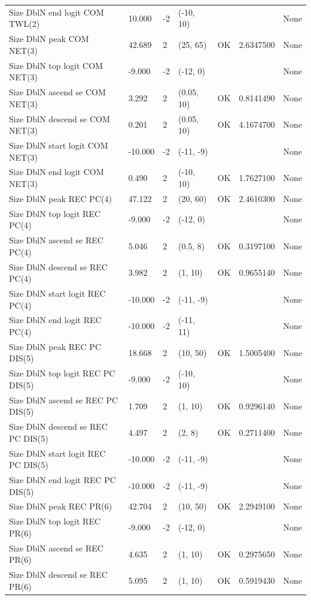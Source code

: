 \documentclass[11pt,
  english,
  a4paper,
]{article}
\begin{document}
\begin{landscape}
\begin{longtable}[t]{>{\raggedright\arraybackslash}p{8.5cm}lllll>{\raggedright\arraybackslash}p{4cm}}
Size DblN end logit COM TWL(2) & 10.000 & -2 & (-10, 10) &  &  & None\\
Size DblN peak COM NET(3) & 42.689 & 2 & (25, 65) & OK & 2.6347500 & None\\
Size DblN top logit COM NET(3) & -9.000 & -2 & (-12, 0) &  &  & None\\
Size DblN ascend se COM NET(3) & 3.292 & 2 & (0.05, 10) & OK & 0.8141490 & None\\
Size DblN descend se COM NET(3) & 0.201 & 2 & (0.05, 10) & OK & 4.1674700 & None\\
Size DblN start logit COM NET(3) & -10.000 & -2 & (-11, -9) &  &  & None\\
Size DblN end logit COM NET(3) & 0.490 & 2 & (-10, 10) & OK & 1.7627100 & None\\
Size DblN peak REC PC(4) & 47.122 & 2 & (20, 60) & OK & 2.4610300 & None\\
Size DblN top logit REC PC(4) & -9.000 & -2 & (-12, 0) &  &  & None\\
Size DblN ascend se REC PC(4) & 5.046 & 2 & (0.5, 8) & OK & 0.3197100 & None\\
Size DblN descend se REC PC(4) & 3.982 & 2 & (1, 10) & OK & 0.9655140 & None\\
Size DblN start logit REC PC(4) & -10.000 & -2 & (-11, -9) &  &  & None\\
Size DblN end logit REC PC(4) & -10.000 & -2 & (-11, 11) &  &  & None\\
Size DblN peak REC PC DIS(5) & 18.668 & 2 & (10, 50) & OK & 1.5005400 & None\\
Size DblN top logit REC PC DIS(5) & -9.000 & -2 & (-10, 10) &  &  & None\\
Size DblN ascend se REC PC DIS(5) & 1.709 & 2 & (1, 10) & OK & 0.9296140 & None\\
Size DblN descend se REC PC DIS(5) & 4.497 & 2 & (2, 8) & OK & 0.2711400 & None\\
Size DblN start logit REC PC DIS(5) & -10.000 & -2 & (-11, -9) &  &  & None\\
Size DblN end logit REC PC DIS(5) & -10.000 & -2 & (-11, -9) &  &  & None\\
Size DblN peak REC PR(6) & 42.704 & 2 & (10, 50) & OK & 2.2949100 & None\\
Size DblN top logit REC PR(6) & -9.000 & -2 & (-12, 0) &  &  & None\\
Size DblN ascend se REC PR(6) & 4.635 & 2 & (1, 10) & OK & 0.2975650 & None\\
Size DblN descend se REC PR(6) & 5.095 & 2 & (1, 10) & OK & 0.5919430 & None\\

\end{longtable}
\end{landscape}
\end{document}
